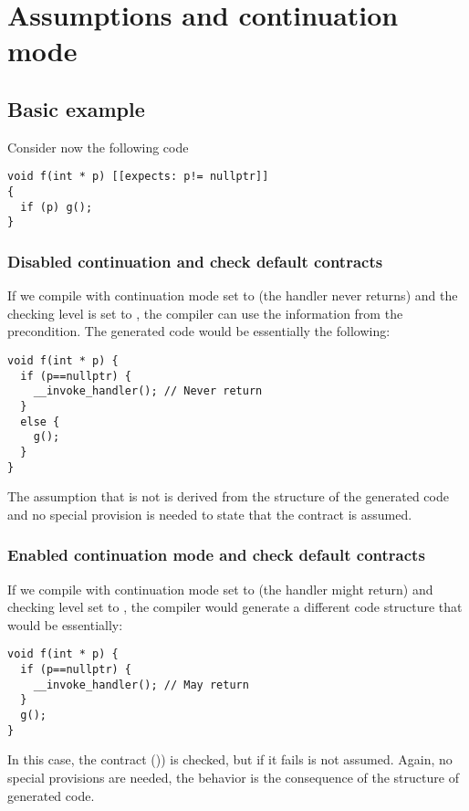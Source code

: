 \section{Assumptions and continuation mode}

\subsection{Basic example}

Consider now the following code

\begin{lstlisting}
void f(int * p) [[expects: p!= nullptr]]
{
  if (p) g();
}
\end{lstlisting}

\subsubsection{Disabled continuation and check default contracts}

If we compile with continuation mode set to  (the handler never returns)
and the checking level is set to , the compiler can
use the information from the precondition. The generated code would be
essentially the following:

\begin{lstlisting}
void f(int * p) {
  if (p==nullptr) {
    __invoke_handler(); // Never return
  }
  else {
    g();
  }
}
\end{lstlisting}

The assumption that  is not  is derived from the
structure of the generated code and no special provision is needed to state
that the contract is assumed.

\subsubsection{Enabled continuation mode and check default contracts}

If we compile with continuation mode set to  (the handler might return)
and checking level set to , the compiler would generate a different
code structure that would be essentially:

\begin{lstlisting}
void f(int * p) {
  if (p==nullptr) {
    __invoke_handler(); // May return
  }
  g();
}
\end{lstlisting}

In this case, the contract ()) is checked, but if it
fails is not assumed. Again, no special provisions are needed, the behavior is the
consequence of the structure of generated code. 


